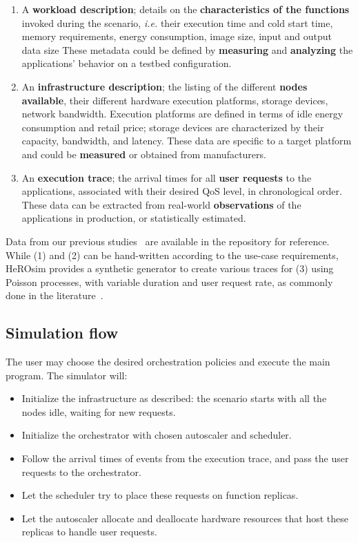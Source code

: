 \begin{enumerate}
    \item A \textbf{workload description}; details on the \textbf{characteristics of the functions}  invoked during the scenario, \textit{i.e.} their execution time and cold start time, memory requirements, energy consumption, image size, input and output data size These metadata could be defined by \textbf{measuring} and \textbf{analyzing} the applications' behavior on a testbed configuration. %
    \item An \textbf{infrastructure description}; the listing of the different \textbf{nodes available}, their different hardware execution platforms, storage devices, network bandwidth. Execution platforms are defined in terms of idle energy consumption and retail price; storage devices are characterized by their capacity, bandwidth, and latency. These data are specific to a target platform and could be \textbf{measured} or obtained from manufacturers.
    \item An \textbf{execution trace}; the arrival times for all \textbf{user requests} to the applications, associated with their desired QoS level, in chronological order. These data can be extracted from real-world \textbf{observations} of the applications in production, or statistically estimated. %
\end{enumerate}

Data from our previous studies~\cite{herofake, herocache} are available in the repository for reference. While (1) and (2) can be hand-written according to the use-case requirements, HeROsim provides a synthetic generator to create various traces for (3) using Poisson processes, with variable duration and user request rate, as commonly done in the literature~\cite{herocache}. 

\subsection{Simulation flow}

The user may choose the desired orchestration policies and execute the main program. The simulator will:

\begin{itemize}
    \item Initialize the infrastructure as described: the scenario starts with all the nodes idle, waiting for new requests.
    \item Initialize the orchestrator with chosen autoscaler and scheduler.
    \item Follow the arrival times of events from the execution trace, and pass the user requests to the orchestrator.
    \item Let the scheduler try to place these requests on function replicas.
    \item Let the autoscaler allocate and deallocate hardware resources that host these replicas to handle user requests.
\end{itemize}

